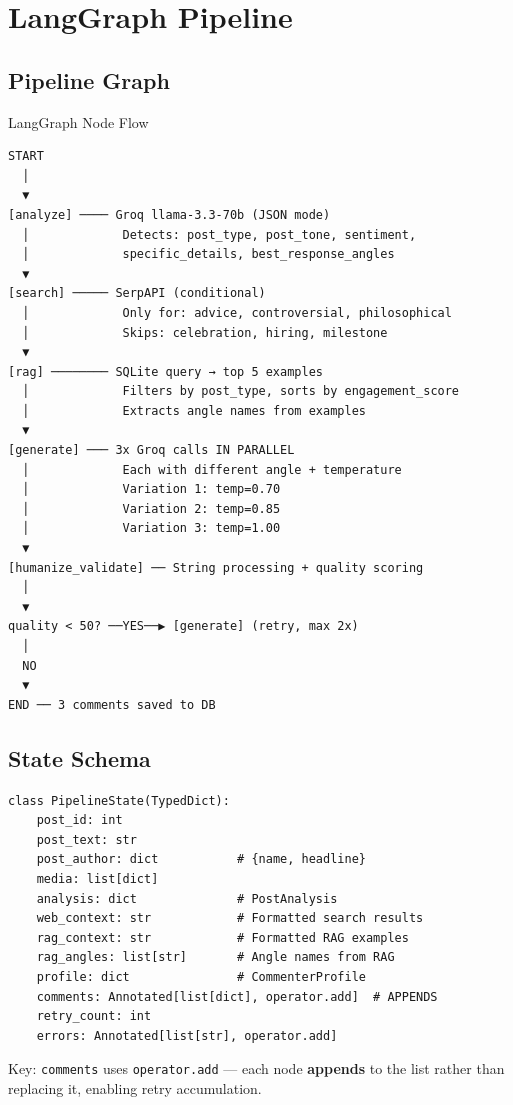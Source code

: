 \documentclass[12pt,a4paper]{article}
\begin{document}
\section{LangGraph Pipeline}

\subsection{Pipeline Graph}

\begin{archbox}{LangGraph Node Flow}
\begin{verbatim}
START
  │
  ▼
[analyze] ──── Groq llama-3.3-70b (JSON mode)
  │             Detects: post_type, post_tone, sentiment,
  │             specific_details, best_response_angles
  ▼
[search] ───── SerpAPI (conditional)
  │             Only for: advice, controversial, philosophical
  │             Skips: celebration, hiring, milestone
  ▼
[rag] ──────── SQLite query → top 5 examples
  │             Filters by post_type, sorts by engagement_score
  │             Extracts angle names from examples
  ▼
[generate] ─── 3x Groq calls IN PARALLEL
  │             Each with different angle + temperature
  │             Variation 1: temp=0.70
  │             Variation 2: temp=0.85
  │             Variation 3: temp=1.00
  ▼
[humanize_validate] ── String processing + quality scoring
  │
  ▼
quality < 50? ──YES──▶ [generate] (retry, max 2x)
  │
  NO
  ▼
END ── 3 comments saved to DB
\end{verbatim}
\end{archbox}

\subsection{State Schema}

\begin{lstlisting}
class PipelineState(TypedDict):
    post_id: int
    post_text: str
    post_author: dict           # {name, headline}
    media: list[dict]
    analysis: dict              # PostAnalysis
    web_context: str            # Formatted search results
    rag_context: str            # Formatted RAG examples
    rag_angles: list[str]       # Angle names from RAG
    profile: dict               # CommenterProfile
    comments: Annotated[list[dict], operator.add]  # APPENDS
    retry_count: int
    errors: Annotated[list[str], operator.add]
\end{lstlisting}

Key: \texttt{comments} uses \texttt{operator.add} --- each node \textbf{appends} to the list rather than replacing it, enabling retry accumulation.
\end{document}
